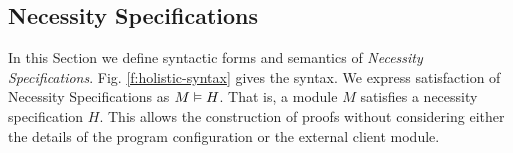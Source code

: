 




\subsection{Necessity Specifications}
\label{s:holistic-guarantees}

In this Section we define syntactic forms and semantics of
\emph{Necessity Specifications}. Fig. \ref{f:holistic-syntax} 
gives the syntax.
We express satisfaction of Necessity Specifications as $M \vDash H$.
That is, a module $M$ satisfies a necessity specification $H$. This allows 
the construction of proofs without considering either the details 
of the program configuration or the external client module.

